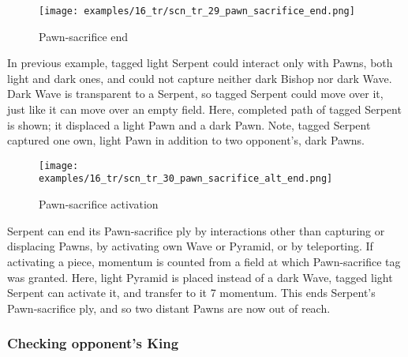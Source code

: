 \vspace*{-1.7\baselineskip}
\noindent
\begin{wrapfigure}[15]{l}{0.4\textwidth}
\centering
\texttt{[image: examples/16\_tr/scn\_tr\_29\_pawn\_sacrifice\_end.png]}
\vspace*{-0.4\baselineskip}
\caption{Pawn-sacrifice end}
\label{fig:scn_tr_29_pawn_sacrifice_end}
\end{wrapfigure}
In previous example, tagged light Serpent could interact only with Pawns, both light
and dark ones, and  could not capture neither dark Bishop nor dark Wave. Dark Wave
is transparent to a Serpent, so tagged Serpent could move over it, just like it can
move over an empty field.\newline
\indent
Here, completed path of tagged Serpent is shown; it displaced a light Pawn and a dark
Pawn. Note, tagged Serpent captured one own, light Pawn in addition to two opponent's,
dark Pawns.

\noindent
\begin{wrapfigure}[15]{l}{0.4\textwidth}
\centering
\texttt{[image: examples/16\_tr/scn\_tr\_30\_pawn\_sacrifice\_alt\_end.png]}
\vspace*{-0.4\baselineskip}
\caption{Pawn-sacrifice activation}
\label{fig:scn_tr_30_pawn_sacrifice_alt_end}
\end{wrapfigure}
Serpent can end its Pawn-sacrifice ply by interactions other than capturing or
displacing Pawns, by activating own Wave or Pyramid, or by teleporting. If activating
a piece, momentum is counted from a field at which Pawn-sacrifice tag was granted.\newline
\indent
Here, light Pyramid is placed instead of a dark Wave, tagged light Serpent can
activate it, and transfer to it 7 momentum. This ends Serpent's Pawn-sacrifice ply,
and so two distant Pawns are now out of reach.

\clearpage %

\subsubsection*{Checking opponent's King}
\label{sec:Tamoanchan Revisited/Serpent/Movement/Checking opponent's King}

